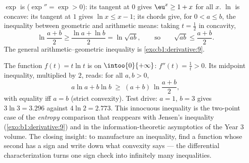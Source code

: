 \begin{example}\label{ex:b1:derivative:convexineq}
$\exp$ is  ($\exp'' = \exp > 0$): its tangent at $0$ gives
$\eu^x \geq 1 + x$ for all $x$. $\ln$ is concave: its tangent at $1$
gives $\ln x \leq x - 1$; its chords give, for $0 < a \leq b$, the
inequality between geometric and arithmetic means: taking $t =
\frac12$ in concavity,
\[
\ln\frac{a + b}{2} \geq \frac{\ln a + \ln b}{2} = \ln\sqrt{ab},
\qquad\text{so}\qquad
\sqrt{ab} \leq \frac{a+b}{2} .
\]
The general arithmetic--geometric inequality is
\cref{exo:b1:derivative:9}.
\end{example}

\begin{example}\label{ex:b1:derivative:xlnx}
The function $f(t) = t\ln t$ is  on $\intoo{0}{+\infty}$:
$f''(t) = \frac1t > 0$. Its midpoint inequality, multiplied by
$2$, reads: for all $a, b > 0$,
\[
a\ln a + b\ln b \;\geq\; (a + b)\,\ln\frac{a + b}{2} ,
\]
with equality iff $a = b$ (strict convexity). Test drive: $a =
1$, $b = 3$ gives $3\ln 3 = 3.296$ against $4\ln 2 = 2.773$.
This innocuous inequality is the two-point case of the
\emph{entropy} comparison that reappears with Jensen's
inequality (\cref{exo:b1:derivative:9}) and in the
information-theoretic asymptotics of the Year 3 volume. The
closing insight: to manufacture an inequality, find a function
whose second  has a sign and write down what convexity
says --- the differential characterization turns one sign check
into infinitely many inequalities.
\end{example}

